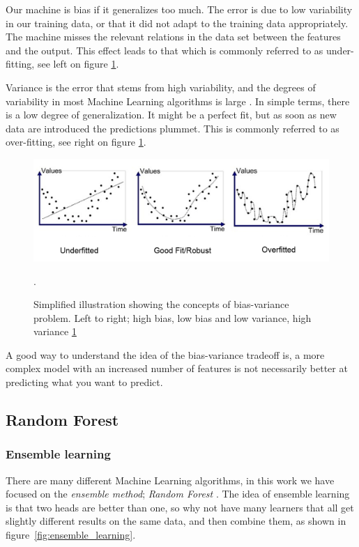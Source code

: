 Our machine is bias if it generalizes too much. The error is due to low variability in our training data, or that it did not adapt to the training data appropriately. The machine misses the relevant relations in the data set between the features and the output. This effect leads to that which is commonly referred to as under-fitting, see left on figure \ref{fig:bias_var}. 

Variance is the error that stems from high variability, and the degrees of variability in most Machine Learning algorithms is large \cite{marsland2014machine}. In simple terms, there is a low degree of generalization. It might be a perfect fit, but as soon as new data are introduced the predictions plummet. This is commonly referred to as over-fitting, see right on figure \ref{fig:bias_var}. 

\begin{figure}[h]
     \centering
     \includegraphics[width=\linewidth]{theory/figures/Bias_variance.png}
     \caption{Simplified illustration showing the concepts of bias-variance problem. Left to right; high bias, low bias and low variance, high variance \ref{fig:bias_var}}.
     \label{fig:bias_var}
\end{figure}

A good way to understand the idea of the bias-variance tradeoff is, a more complex model with an increased number of features is not necessarily better at predicting what you want to predict. 


\subsection{Random Forest}

\subsubsection{Ensemble learning}
	There are many different Machine Learning algorithms, in this work we have focused on the \textit{ensemble method}; \textit{Random Forest} \cite{breiman2001random}. The idea of ensemble learning is that two heads are better than one, so why not have many learners that all get slightly different results on the same data, and then combine them, as shown in figure \ref{fig:ensemble_learning}.
	
